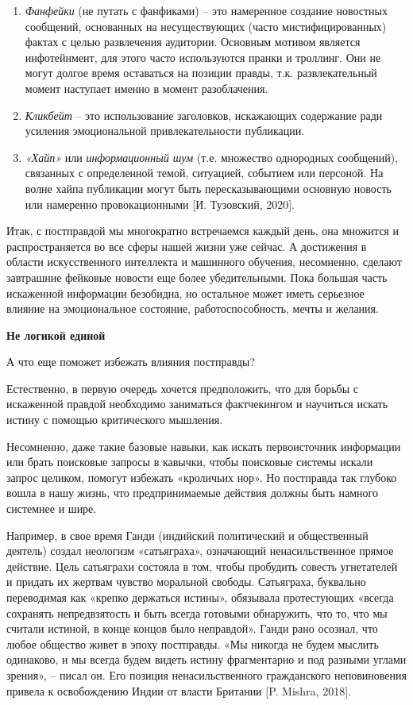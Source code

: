\begin{enumerate}
    \item \textit{Фанфейки} (не путать с фанфиками) – это намеренное создание новостных сообщений, основанных на несуществующих (часто мистифицированных) фактах с целью развлечения аудитории. Основным мотивом является инфотейнмент, для этого часто используются пранки и троллинг. Они не могут долгое время оставаться на позиции правды, т.к. развлекательный момент наступает именно в момент разоблачения.
    \item \textit{Кликбейт} – это использование заголовков, искажающих содержание ради усиления эмоциональной привлекательности публикации.
    \item \textit{«Хайп»} или \textit{информационный шум} (т.е. множество однородных сообщений), связанных с определенной темой, ситуацией, событием или персоной. На волне хайпа публикации могут быть пересказывающими основную новость или намеренно провокационными [И. Тузовский, 2020].
\end{enumerate}

Итак, с постправдой мы многократно встречаемся каждый день, она множится и распространяется во все сферы нашей жизни уже сейчас. А достижения в области искусственного интеллекта и машинного обучения, несомненно, сделают завтрашние фейковые новости еще более убедительными. Пока большая часть искаженной информации безобидна, но остальное может иметь серьезное влияние на эмоциональное состояние, работоспособность, мечты и желания.

\textbf{Не логикой единой}

А что еще поможет избежать влияния постправды?

Естественно, в первую очередь хочется предположить, что для борьбы с искаженной правдой необходимо заниматься фактчекингом и научиться искать истину с помощью критического мышления.

Несомненно, даже такие базовые навыки, как искать первоисточник информации или брать поисковые запросы в кавычки, чтобы поисковые системы искали запрос целиком, помогут избежать «кроличьих нор». Но постправда так глубоко вошла в нашу жизнь, что предпринимаемые действия должны быть намного системнее и шире.

Например, в свое время Ганди (индийский политический и общественный деятель) создал неологизм «сатьяграха», означающий ненасильственное прямое действие. Цель сатьяграхи состояла в том, чтобы пробудить совесть угнетателей и придать их жертвам чувство моральной свободы. Сатьяграха, буквально переводимая как «крепко держаться истины», обязывала протестующих «всегда сохранять непредвзятость и быть всегда готовыми обнаружить, что то, что мы считали истиной, в конце концов было неправдой». Ганди рано осознал, что любое общество живет в эпоху постправды. «Мы никогда не будем мыслить одинаково, и мы всегда будем видеть истину фрагментарно и под разными углами зрения», – писал он. Его позиция ненасильственного гражданского неповиновения привела к освобождению Индии от власти Британии [P. Mishra, 2018].

